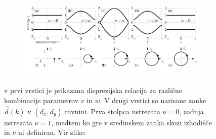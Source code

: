 \begin{figure}[H]
\centering
\begin{subfigure}{.9\textwidth}
\includegraphics[width=\linewidth]{Figures/GapAndTopology.pdf}
\end{subfigure}
\caption{v prvi vrstici je prikazana disprezijska relacija za različne kombinacije parametrov $v$ in $w$. V drugi vrstici so narisane zanke $\vec{d}(k)$ v $(d_x , d_y)$ ravnini. Prva stolpca ustrezata $\nu = 0$, zadnja ustrezata $\nu = 1$, medtem ko gre v sredinskem zanka skozi izhodišče in $\nu$ ni definiran. Vir slike: \cite{madzar}}
\label{fig:examples}
\end{figure}

